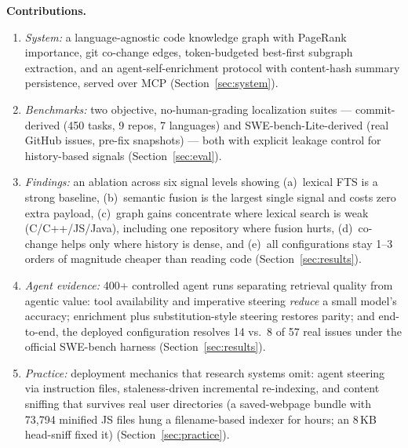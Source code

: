 \documentclass[11pt]{article}
\begin{document}
\textbf{Contributions.}
\begin{enumerate}
  \item \emph{System:} a language-agnostic code knowledge graph with
        PageRank importance, git co-change edges, token-budgeted best-first
        subgraph extraction, and an agent-self-enrichment protocol with
        content-hash summary persistence, served over MCP
        (Section~\ref{sec:system}).
  \item \emph{Benchmarks:} two objective, no-human-grading localization
        suites --- commit-derived (450 tasks, 9 repos, 7 languages) and
        SWE-bench-Lite-derived (real GitHub issues, pre-fix snapshots) ---
        both with explicit leakage control for history-based signals
        (Section~\ref{sec:eval}).
  \item \emph{Findings:} an ablation across six signal levels showing
        (a)~lexical FTS is a strong baseline, (b)~semantic fusion is the
        largest single signal and costs zero extra payload, (c)~graph gains
        concentrate where lexical search is weak (C/C++/JS/Java), including
        one repository where fusion hurts, (d)~co-change helps only where
        history is dense, and (e)~all configurations stay 1--3 orders of
        magnitude cheaper than reading code (Section~\ref{sec:results}).
  \item \emph{Agent evidence:} 400+ controlled agent runs separating
        retrieval quality from agentic value: tool availability and
        imperative steering \emph{reduce} a small model's accuracy;
        enrichment plus substitution-style steering restores parity; and
        end-to-end, the deployed configuration resolves 14 vs.\ 8 of 57
        real issues under the official SWE-bench harness
        (Section~\ref{sec:results}).
  \item \emph{Practice:} deployment mechanics that research systems omit:
        agent steering via instruction files, staleness-driven incremental
        re-indexing, and content sniffing that survives real user
        directories (a saved-webpage bundle with 73{,}794 minified JS files
        hung a filename-based indexer for hours; an 8\,KB head-sniff fixed
        it) (Section~\ref{sec:practice}).
\end{enumerate}
\end{document}
